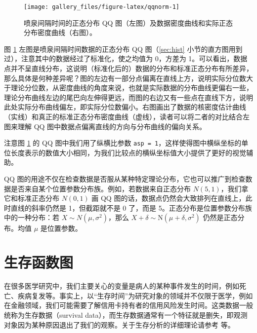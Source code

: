 \documentclass[
  b5paper,
  UTF8,twoside]{book}
\begin{document}
\begin{figure}

{\centering \texttt{[image: gallery\_files/figure-latex/qqnorm-1]} 

}

\caption[喷泉间隔时间的正态分布 QQ 图]{喷泉间隔时间的正态分布 QQ 图（左图）及数据密度曲线和实际正态分布密度曲线（右图）。}\label{fig:qqnorm}
\end{figure}

图 \ref{fig:qqnorm} 左图是喷泉间隔时间数据的正态分布 QQ 图（\ref{sec:hist} 小节的直方图用到过），注意其中的数据经过了标准化，使之均值为 0，方差为 1。可以看出，数据点并不呈直线分布，这说明（标准化后的）数据的分布和标准正态分布有所差异，那么具体是何种差异呢？图的左边有一部分点偏离在直线上方，说明实际分位数大于理论分位数，从密度曲线的角度来说，也就是实际数据的分布曲线更偏右一些，理论分布曲线左边的尾巴向左伸得更远，而图的右边又有一些点在直线下方，说明此处实际分布曲线偏左，即实际分位数偏小。右图画出了数据的核密度估计曲线（实线）和真正的标准正态分布密度曲线（虚线），读者可以将二者的对比结合左图来理解 QQ 图中数据点偏离直线的方向与分布曲线的偏向关系。

注意图 \ref{fig:qqnorm} 的 QQ 图中我们用了纵横比参数 \texttt{asp\ =\ 1}，这样使得图中横纵坐标的单位长度表示的数值大小相同，为我们比较点的横纵坐标值大小提供了更好的视觉辅助。

QQ 图的用途不仅在检查数据是否服从某种特定理论分布，它也可以推广到检查数据是否来自某个位置参数分布族。例如，若数据来自正态分布 \(N(5,1)\)，我们拿它和标准正态分布 \(N(0,1)\) 画 QQ 图的话，数据点仍然会大致排列在直线上，此时直线的斜率仍然是 1，但截距就不是 0 了，而是 5。正态分布是位置参数分布族中的一种分布：若 \(X\sim N(\mu,\sigma^{2})\)，那么 \(X + \delta \sim \mathrm{N}(\mu+\delta,\sigma^{2})\) 仍然是正态分布。均值 \(\mu\) 是位置参数。

\hypertarget{ux751fux5b58ux51fdux6570ux56fe}{%
\section{生存函数图}\label{ux751fux5b58ux51fdux6570ux56fe}}

在很多医学研究中，我们主要关心的变量是病人的某种事件发生的时间，例如死亡、疾病复发等。事实上，以``生存时间''为研究对象的领域并不仅限于医学，例如在金融领域，我们可能需要了解信用卡持有者的信用风险发生时间。这类数据一般统称为生存数据（survival data），而生存数据通常有一个特征就是删失，即观测对象因为某种原因退出了我们的观察。关于生存分析的详细理论请参考 \citet{Therneau00} 等。
\end{document}
